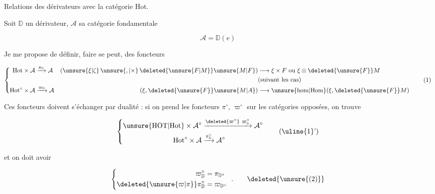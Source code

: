 
Relations des dérivateurs avec la catégorie Hot.

Soit $\mathbb D$ un dérivateur, $\mathcal A$ sa catégorie fondamentale

\[\mathcal A=\mathbb D(e)\]

Je me propose de définir,   faire se peut, des foncteurs

\[
\left\{\begin{aligned}
\mathrm{Hot}\times\mathcal A&\xrightarrow{\pi_{\mathbb D}}\mathcal A
&(\unsure{\xi|\zeta}\,\unsure{,|\times}\,\deleted{\unsure{F|M}}\unsure{M|F})&\longrightarrow\xi\times F\ \text{ou }\xi\otimes\deleted{\unsure{F}}M\\
&&&\text{(suivant les cas)}\\
\mathrm{Hot}^{\circ}\times\mathcal A&\xrightarrow{\varpi_{\mathbb D}}\mathcal A
&(\xi,\deleted{\unsure{F}}\unsure{M|A})&\longrightarrow
\unsure{\mathrm{hom}|\mathrm{Hom}}(\xi,\deleted{\unsure{F}}M)
\end{aligned}\right.\tag*{(1)}
\]

Ces foncteurs doivent s'échanger par dualité : si on prend les foncteurs $\pi^\circ$, $\varpi^\circ$ sur les catégories opposées, on trouve

\[
\left\{\begin{aligned}
\unsure{\mathrm{HOT}|\mathrm{Hot}}\times\mathcal A^\circ&\xrightarrow{\deleted{\varpi^\circ}\ \varpi_{\mathbb D}^{\circ}}\mathcal A^\circ\\
\mathrm{Hot}^{\circ}\times\mathcal A&\xrightarrow{\pi_{\mathbb D}^{\circ}}\mathcal A^\circ
\end{aligned}\right.\tag*{(\uline{1}')}
\]

et on doit avoir

\[
\left\{\begin{aligned}
\varpi_{\mathbb D}^\circ&=\pi_{\mathbb D^\circ}\\
\deleted{\unsure{\varpi|\pi}}\pi_{\mathbb D}^\circ&=\varpi_{\mathbb D^\circ}
\end{aligned}\right.\ .\tag*{\deleted{\unsure{(2)}}}
\]


